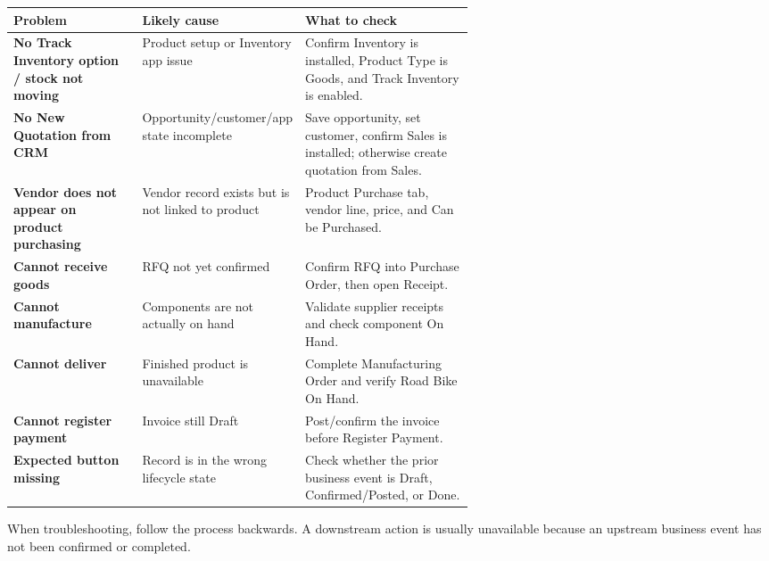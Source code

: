 \begin{erptable}
\begin{tabularx}{\linewidth}{@{}>{\bfseries\leavevmode\color{ERPRed}}p{0.29\linewidth}p{0.31\linewidth}X@{}}
\toprule
\rowcolor{ERPPaleRed!70}
Problem & Likely cause & What to check \\
\midrule
No Track Inventory option / stock not moving & Product setup or Inventory app issue & Confirm Inventory is installed, Product Type is Goods, and Track Inventory is enabled. \\
No New Quotation from CRM & Opportunity/customer/app state incomplete & Save opportunity, set customer, confirm Sales is installed; otherwise create quotation from Sales. \\
Vendor does not appear on product purchasing & Vendor record exists but is not linked to product & Product Purchase tab, vendor line, price, and Can be Purchased. \\
Cannot receive goods & RFQ not yet confirmed & Confirm RFQ into Purchase Order, then open Receipt. \\
Cannot manufacture & Components are not actually on hand & Validate supplier receipts and check component On Hand. \\
Cannot deliver & Finished product is unavailable & Complete Manufacturing Order and verify Road Bike On Hand. \\
Cannot register payment & Invoice still Draft & Post/confirm the invoice before Register Payment. \\
Expected button missing & Record is in the wrong lifecycle state & Check whether the prior business event is Draft, Confirmed/Posted, or Done. \\
\bottomrule
\end{tabularx}
\end{erptable}

\begin{keyidea}
When troubleshooting, follow the process backwards. A downstream action is usually unavailable because an upstream business event has not been confirmed or completed.
\end{keyidea}
